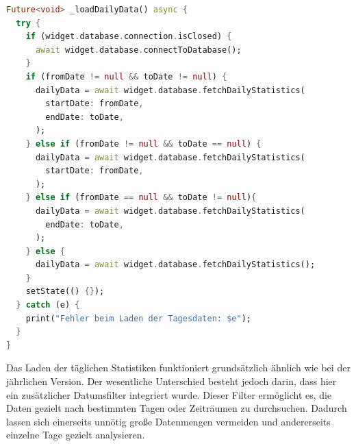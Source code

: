 \documentclass[11pt]{scrartcl}
\begin{document}
    \begin{lstlisting}[language=Dart]
Future<void> _loadDailyData() async {
  try {
    if (widget.database.connection.isClosed) {
      await widget.database.connectToDatabase();
    }
    if (fromDate != null && toDate != null) {
      dailyData = await widget.database.fetchDailyStatistics(
        startDate: fromDate,
        endDate: toDate,
      );
    } else if (fromDate != null && toDate == null) {
      dailyData = await widget.database.fetchDailyStatistics(
        startDate: fromDate,
      );
    } else if (fromDate == null && toDate != null){
      dailyData = await widget.database.fetchDailyStatistics(
        endDate: toDate,
      );
    } else {
      dailyData = await widget.database.fetchDailyStatistics();
    }
    setState(() {});
  } catch (e) {
    print("Fehler beim Laden der Tagesdaten: $e");
  }
}
    \end{lstlisting}
    Das Laden der täglichen Statistiken funktioniert grundsätzlich ähnlich wie bei der jährlichen Version.
    Der wesentliche Unterschied besteht jedoch darin, dass hier ein zusätzlicher Datumsfilter integriert wurde.
    Dieser Filter ermöglicht es, die Daten gezielt nach bestimmten Tagen oder Zeiträumen zu durchsuchen.
    Dadurch lassen sich einerseits unnötig große Datenmengen vermeiden und andererseits einzelne Tage gezielt analysieren.
\end{document}
